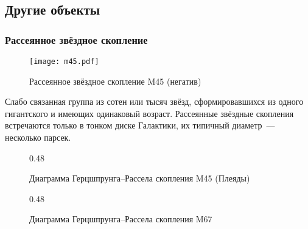 \subsection{Другие объекты}

\subsubsection*{Рассеянное звёздное скопление}
\begin{wrapfigure}[7]{r}{0.32\tw}
    \vspace{-1pc}
    \centering
    \texttt{[image: m45.pdf]}
    \caption{Рассеянное звёздное скопление M45 (негатив)}
\end{wrapfigure}
Слабо связанная группа из сотен или тысяч звёзд, сформировавшихся из одного гигантского  и имеющих одинаковый возраст. Рассеянные звёздные скопления встречаются только в тонком диске Галактики, их типичный диаметр~--- несколько парсек.
\begin{figure}[h!]
    \begin{subcaptionblock}{0.48\tw}
        \centering
        \caption{Диаграмма Герцшпрунга--Рассела скопления M45 (Плеяды)}
    \end{subcaptionblock}
    \hfill
    \begin{subcaptionblock}{0.48\tw}
        \centering
        \caption{Диаграмма Герцшпрунга--Рассела скопления M67}
    \end{subcaptionblock}
    \caption{}
\end{figure}

